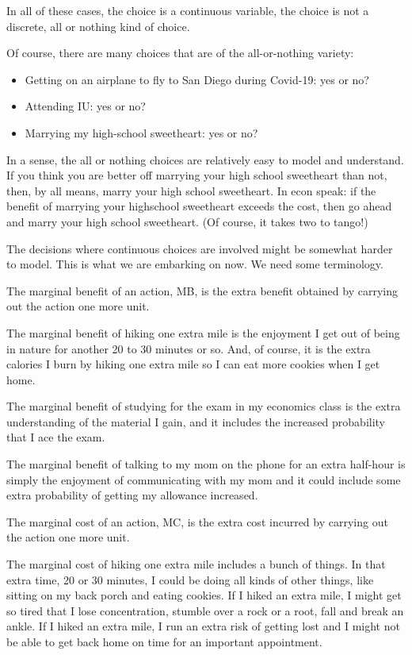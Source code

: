 \documentclass[
]{book}
\providecommand{\tightlist}{%
  \setlength{\itemsep}{0pt}\setlength{\parskip}{0pt}}
\begin{document}
In all of these cases, the choice is a continuous variable, the choice is not a discrete, all or nothing kind of choice.

Of course, there are many choices that are of the all-or-nothing variety:

\begin{itemize}
\tightlist
\item
  Getting on an airplane to fly to San Diego during Covid-19: yes or no?
\item
  Attending IU: yes or no?
\item
  Marrying my high-school sweetheart: yes or no?
\end{itemize}

In a sense, the all or nothing choices are relatively easy to model and understand. If you think you are better off marrying your high school sweetheart than not, then, by all means, marry your high school sweetheart. In econ speak: if the benefit of marrying your highschool sweetheart exceeds the cost, then go ahead and marry your high school sweetheart. (Of course, it takes two to tango!)

The decisions where continuous choices are involved might be somewhat harder to model. This is what we are embarking on now. We need some terminology.

The marginal benefit of an action, MB, is the extra benefit obtained by carrying out the action one more unit.

The marginal benefit of hiking one extra mile is the enjoyment I get out of being in nature for another 20 to 30 minutes or so. And, of course, it is the extra calories I burn by hiking one extra mile so I can eat more cookies when I get home.

The marginal benefit of studying for the exam in my economics class is the extra understanding of the material I gain, and it includes the increased probability that I ace the exam.

The marginal benefit of talking to my mom on the phone for an extra half-hour is simply the enjoyment of communicating with my mom and it could include some extra probability of getting my allowance increased.

The marginal cost of an action, MC, is the extra cost incurred by carrying out the action one more unit.

The marginal cost of hiking one extra mile includes a bunch of things. In that extra time, 20 or 30 minutes, I could be doing all kinds of other things, like sitting on my back porch and eating cookies. If I hiked an extra mile, I might get so tired that I lose concentration, stumble over a rock or a root, fall and break an ankle. If I hiked an extra mile, I run an extra risk of getting lost and I might not be able to get back home on time for an important appointment.
\end{document}
